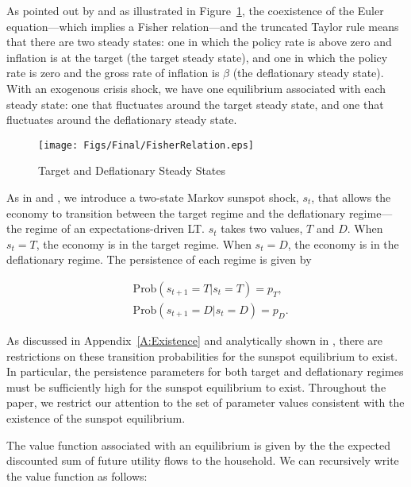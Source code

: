 \documentclass[11pt]{article}
\begin{document}
	As pointed out by \citet{BenhabibSchmittGroheUribe2002} and as illustrated in Figure~\ref{fig:FisherTaylor}, the coexistence of the Euler equation---which implies a Fisher relation---and the truncated Taylor rule means that there are two steady states: one in which the policy rate is above zero and inflation is at the target (the target steady state), and one in which the policy rate is zero and the gross rate of inflation is $\beta$ (the deflationary steady state). With an exogenous crisis shock, we have one equilibrium associated with each steady state: one that fluctuates around the target steady state, and one that fluctuates around the deflationary steady state.

	\begin{figure}[!h]
		\begin{center}
			\caption{Target and Deflationary Steady States\label{fig:FisherTaylor}}
			\texttt{[image: Figs/Final/FisherRelation.eps]}\\
		\end{center}
	\end{figure}

	As in \citet{MertensRavn2014} and \citet{AruobaCubaBordaSchorfheide2018}, we introduce a two-state Markov sunspot shock, $s_{t}$, that allows the economy to transition between the target regime and the deflationary regime---the regime of an expectations-driven LT. $s_{t}$ takes two values, $T$ and $D$. When $s_{t}=T$, the economy is in the target regime. When $s_{t}=D$, the economy is in the deflationary regime. The persistence of each regime is given by

	\begin{align}
		& \text{Prob}(s_{t+1}=T|s_{t}=T)= p_{T},\\
		& \text{Prob}(s_{t+1}=D|s_{t}=D)= p_{D}.
	\end{align}

	\noindent As discussed in Appendix~\ref{A:Existence} and analytically shown in \citet{NakataSchmidt2019}, there are restrictions on these transition probabilities for the sunspot equilibrium to exist. In particular, the persistence parameters for both target and deflationary regimes must be sufficiently high for the sunspot equilibrium to exist. Throughout the paper, we restrict our attention to the set of parameter values consistent with the existence of the sunspot equilibrium.

	The value function associated with an equilibrium is given by the the expected discounted sum of future utility flows to the household. We can recursively write the value function as follows:
\end{document}
